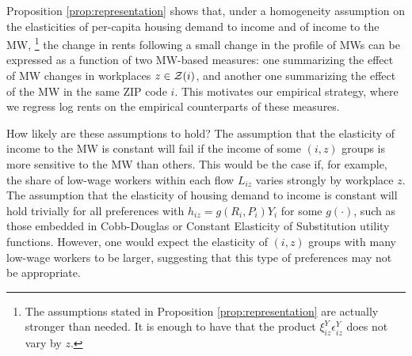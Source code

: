 Proposition \ref{prop:representation} shows that, under a homogeneity assumption
on the elasticities of per-capita housing demand to income and 
of income to the MW,%
\footnote{The assumptions stated in Proposition \ref{prop:representation} are 
actually stronger than needed.
It is enough to have that the product $\xi^Y_{iz} \epsilon_{iz}^Y$ does not vary 
by $z$.}
the change in rents following a small change in the profile of MWs can be 
expressed as a function of two MW-based measures:
one summarizing the effect of MW changes in workplaces $z\in\mathcal{Z}(i)$,
and another one summarizing the effect of the MW in the same ZIP code $i$.
This motivates our empirical strategy, where we regress log rents on the 
empirical counterparts of these measures.

How likely are these assumptions to hold?
The assumption that the elasticity of income to the MW is constant will fail if 
the income of some $(i,z)$ groups is more sensitive to the MW than others.
This would be the case if, for example, the share of low-wage workers within 
each flow $L_{iz}$ varies strongly by workplace $z$.
The assumption that the elasticity of housing demand to income is constant 
will hold trivially for all preferences with
$h_{iz} = g\left(R_i, P_i\right) Y_i$ for some $g\left(\cdot\right)$, such as 
those embedded in Cobb-Douglas or Constant Elasticity of Substitution utility 
functions.
However, one would expect the elasticity of $(i,z)$ groups with many low-wage 
workers to be larger, suggesting that this type of preferences may not be 
appropriate.

